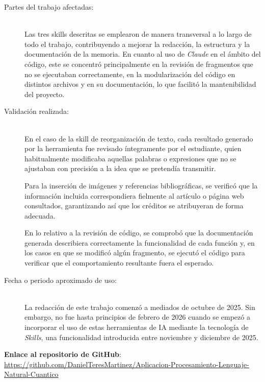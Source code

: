 \begin{description}
      \item[Partes del trabajo afectadas:] \hfill \\
            Las tres skills descritas se emplearon de manera transversal a lo largo de todo el trabajo, contribuyendo a mejorar la redacción, la estructura y la documentación de la memoria. En cuanto al uso de \textit{Claude} en el ámbito del código, este se concentró principalmente en la revisión de fragmentos que no se ejecutaban correctamente, en la modularización del código en distintos archivos y en su documentación, lo que facilitó la mantenibilidad del proyecto.

      \item[Validación realizada:] \hfill \\
            En el caso de la skill de reorganización de texto, cada resultado generado por la herramienta fue revisado íntegramente por el estudiante, quien habitualmente modificaba aquellas palabras o expresiones que no se ajustaban con precisión a la idea que se pretendía transmitir.

            Para la inserción de imágenes y referencias bibliográficas, se verificó que la información incluida correspondiera fielmente al artículo o página web consultados, garantizando así que los créditos se atribuyeran de forma adecuada.

            En lo relativo a la revisión de código, se comprobó que la documentación generada describiera correctamente la funcionalidad de cada función y, en los casos en que se modificó algún fragmento, se ejecutó el código para verificar que el comportamiento resultante fuera el esperado.

      \item[Fecha o periodo aproximado de uso:] \hfill \\
            La redacción de este trabajo comenzó a mediados de octubre de 2025. Sin embargo, no fue hasta principios de febrero de 2026 cuando se empezó a incorporar el uso de estas herramientas de IA mediante la tecnología de \textit{Skills}, una funcionalidad introducida entre noviembre y diciembre de 2025.
\end{description}


\textbf{Enlace al repositorio de GitHub}: \url{https://github.com/DanielTeresMartinez/Aplicacion-Procesamiento-Lenguaje-Natural-Cuantico}


